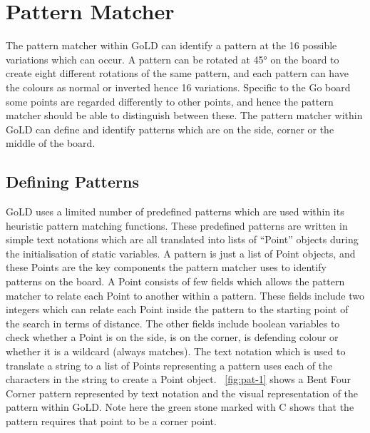 \documentclass{l4proj}
\begin{document}
\section{Pattern Matcher}
The pattern matcher within GoLD can identify a pattern at the 16 possible variations which can occur. A pattern can be rotated at 45° on the board to create eight different rotations of the same pattern, and each pattern can have the colours as normal or inverted hence 16 variations. Specific to the Go board some points are regarded differently to other points, and hence the pattern matcher should be able to distinguish between these. The pattern matcher within GoLD can define and identify patterns which are on the side, corner or the middle of the board.

\subsection{Defining Patterns}
GoLD uses a limited number of predefined patterns which are used within its heuristic pattern matching functions. These predefined patterns are written in simple text notations which are all translated into lists of “Point” objects during the initialisation of static variables. A pattern is just a list of Point objects, and these Points are the key components the pattern matcher uses to identify patterns on the board. A Point consists of few fields which allows the pattern matcher to relate each Point to another within a pattern. These fields include two integers which can relate each Point inside the pattern to the starting point of the search in terms of distance. The other fields include boolean variables to check whether a Point is on the side, is on the corner, is defending colour or whether it is a wildcard (always matches). The text notation which is used to translate a string to a list of Points representing a pattern uses each of the characters in the string to create a Point object. ~\autoref{fig:pat-1} shows a Bent Four Corner pattern represented by text notation and the visual representation of the pattern within GoLD. Note here the green stone marked with C shows that the pattern requires that point to be a corner point.
\end{document}
